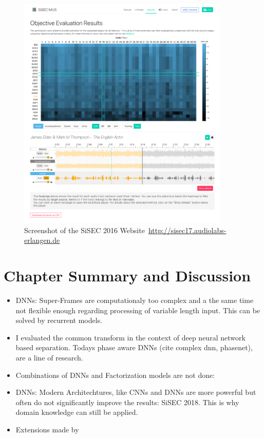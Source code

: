 \begin{figure}[t]
\centering
\includegraphics[width=0.9\textwidth]{Chapters/06_Separation_Unknown/figures/sisec_website.png}
\caption{Screenshot of the SiSEC 2016 Website~\url{http://sisec17.audiolabs-erlangen.de}}
\label{fig:sisec_website}

\end{figure}

\section{Chapter Summary and Discussion}

\begin{itemize}
  \item DNNs: Super-Frames are computationaly too complex and a the same time not flexible enough regarding processing of variable length input. This can be solved by recurrent models. 
  \item I evaluated the common transform in the context of deep neural network based separation.
  Todays phase aware DNNs (cite complex dnn, phasenet), are a line of research.
  \item Combinations of DNNs and Factorization models are not done: ~\cite{vu16, leroux15}
  \item DNNs: Modern Architechtures, like CNNs and DNNs are more powerful but often do not significantly improve the results: SiSEC 2018. This is why domain knowledge can still be applied.
  \item Extensions made by~\cite{seetharaman17, pishdadian17}
\end{itemize}
